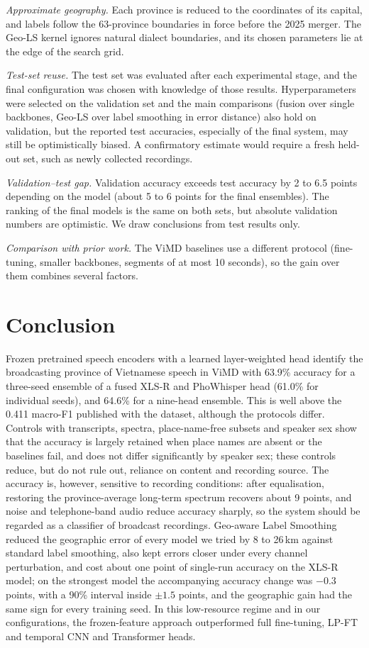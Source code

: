 \documentclass[conference]{IEEEtran}
\begin{document}
\textit{Approximate geography.} Each province is reduced to the coordinates of its capital, and labels follow the 63-province boundaries in force before the 2025 merger. The Geo-LS kernel ignores natural dialect boundaries, and its chosen parameters lie at the edge of the search grid.

\textit{Test-set reuse.} The test set was evaluated after each experimental stage, and the final configuration was chosen with knowledge of those results. Hyperparameters were selected on the validation set and the main comparisons (fusion over single backbones, Geo-LS over label smoothing in error distance) also hold on validation, but the reported test accuracies, especially of the final system, may still be optimistically biased. A confirmatory estimate would require a fresh held-out set, such as newly collected recordings.

\textit{Validation--test gap.} Validation accuracy exceeds test accuracy by 2 to 6.5 points depending on the model (about 5 to 6 points for the final ensembles). The ranking of the final models is the same on both sets, but absolute validation numbers are optimistic. We draw conclusions from test results only.

\textit{Comparison with prior work.} The ViMD baselines use a different protocol (fine-tuning, smaller backbones, segments of at most 10 seconds), so the gain over them combines several factors.

\section{Conclusion}
Frozen pretrained speech encoders with a learned layer-weighted head identify the broadcasting province of Vietnamese speech in ViMD with 63.9\% accuracy for a three-seed ensemble of a fused XLS-R and PhoWhisper head (61.0\% for individual seeds), and 64.6\% for a nine-head ensemble. This is well above the 0.411 macro-F1 published with the dataset, although the protocols differ. Controls with transcripts, spectra, place-name-free subsets and speaker sex show that the accuracy is largely retained when place names are absent or the baselines fail, and does not differ significantly by speaker sex; these controls reduce, but do not rule out, reliance on content and recording source. The accuracy is, however, sensitive to recording conditions: after equalisation, restoring the province-average long-term spectrum recovers about 9 points, and noise and telephone-band audio reduce accuracy sharply, so the system should be regarded as a classifier of broadcast recordings. Geo-aware Label Smoothing reduced the geographic error of every model we tried by 8 to 26\,km against standard label smoothing, also kept errors closer under every channel perturbation, and cost about one point of single-run accuracy on the XLS-R model; on the strongest model the accompanying accuracy change was $-0.3$ points, with a 90\% interval inside $\pm 1.5$ points, and the geographic gain had the same sign for every training seed. In this low-resource regime and in our configurations, the frozen-feature approach outperformed full fine-tuning, LP-FT and temporal CNN and Transformer heads.
\end{document}

